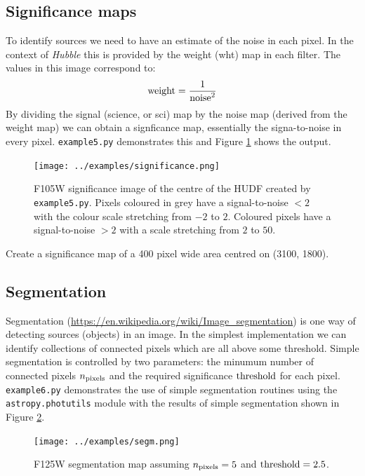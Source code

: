 \documentclass{article}
\begin{document}
\subsection{Significance maps}

To identify sources we need to have an estimate of the noise in each pixel. In the context of {\em Hubble} this is provided by the weight (wht) map in each filter. The values in this image correspond to:
\[
{\rm weight} = \frac{1}{{\rm noise}^2}
\]
By dividing the signal (science, or sci) map by the noise map (derived from the weight map) we can obtain a signficance map, essentially the signa-to-noise in every pixel. \texttt{example5.py} demonstrates this and Figure \ref{fig:significance} shows the output.

\begin{figure}\label{fig:significance}
	\centering
	\texttt{[image: ../examples/significance.png]}
	\caption{F105W significance image of the centre of the HUDF created by \texttt{example5.py}. Pixels coloured in grey have a signal-to-noise $<2$ with the colour scale stretching from $-2$ to $2$. Coloured pixels have a signal-to-noise $>2$ with a scale stretching from $2$ to $50$.}
\end{figure}


\begin{question}
Create a significance map of a 400 pixel wide area centred on (3100, 1800).
\end{question}


\subsection{Segmentation}

Segmentation (\url{https://en.wikipedia.org/wiki/Image_segmentation}) is one way of detecting sources (objects) in an image. In the simplest implementation we can identify collections of connected pixels which are all above some threshold. Simple segmentation is controlled by two parameters: the minumum number of connected pixels $n_{\rm pixels}$ and the required significance ${\rm threshold}$ for each pixel. \texttt{example6.py} demonstrates the use of simple segmentation routines using the \texttt{astropy.photutils} module with the results of simple segmentation shown in Figure \ref{fig:segm}.

\begin{figure}\label{fig:segm}
	\centering
	\texttt{[image: ../examples/segm.png]}
	\caption{F125W segmentation map assuming $n_{\rm pixels} = 5$ and ${\rm threshold} = 2.5$.}
\end{figure}
\end{document}
